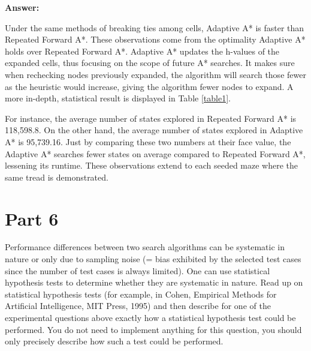 \documentclass{article}
\begin{document}
{\color{blue} \textbf{Answer:}

Under the same methods of breaking ties among cells, Adaptive A* is faster than Repeated Forward A*. These observations come from the optimality Adaptive A* holds over Repeated Forward A*. Adaptive A* updates the h-values of the expanded cells, thus focusing on the scope of future A* searches. It makes sure when rechecking nodes previously expanded, the algorithm will search those fewer as the heuristic would increase, giving the algorithm fewer nodes to expand. A more in-depth, statistical result is displayed in Table \ref{table1}.

For instance, the average number of states explored in Repeated Forward A* is 118,598.8. On the other hand, the average number of states explored in Adaptive A* is 95,739.16. Just by comparing these two numbers at their face value, the Adaptive A* searches fewer states on average compared to Repeated Forward A*, lessening its runtime. These observations extend to each seeded maze where the same tread is demonstrated.
}

\newpage
\section*{Part 6}
Performance differences between two search algorithms can be systematic in nature or only due to sampling noise (= bias exhibited by the selected test cases since the number of test cases is always limited). One can use statistical hypothesis tests to determine whether they are systematic in nature. Read up on statistical hypothesis tests (for example, in Cohen, Empirical Methods for Artificial Intelligence, MIT Press, 1995) and then describe for one of the experimental questions above exactly how a statistical hypothesis test could be performed. You do not need to implement anything for this question, you should only precisely describe how such a test could be performed.
\end{document}
